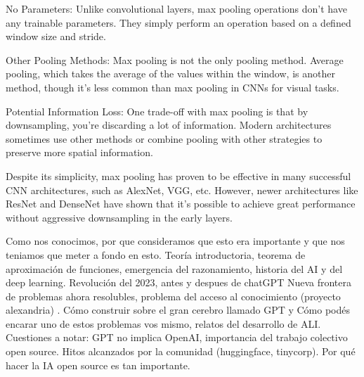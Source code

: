     No Parameters: Unlike convolutional layers, max pooling operations don’t have any trainable parameters. They simply perform an operation based on a defined window size and stride.

    Other Pooling Methods: Max pooling is not the only pooling method. Average pooling, which takes the average of the values within the window, is another method, though it’s less common than max pooling in CNNs for visual tasks.

    Potential Information Loss: One trade-off with max pooling is that by downsampling, you're discarding a lot of information. Modern architectures sometimes use other methods or combine pooling with other strategies to preserve more spatial information.

Despite its simplicity, max pooling has proven to be effective in many successful CNN architectures, such as AlexNet, VGG, etc. However, newer architectures like ResNet and DenseNet have shown that it's possible to achieve great performance without aggressive downsampling in the early layers.




















Como nos conocimos, por que consideramos que esto era importante y que nos teniamos que meter a fondo en esto.
Teoría introductoria, teorema de aproximación de funciones, emergencia del razonamiento, historia del AI y del deep learning.
Revolución del 2023, antes y despues de chatGPT
Nueva frontera de problemas ahora resolubles, problema del acceso al conocimiento (proyecto alexandria) .
Cómo construir sobre el gran cerebro llamado GPT y Cómo podés encarar uno de estos problemas vos mismo, relatos del desarrollo de ALI.
Cuestiones a notar: GPT no implica OpenAI, importancia del trabajo colectivo open source. Hitos alcanzados por la comunidad (huggingface, tinycorp). Por qué hacer la IA open source es tan importante.





